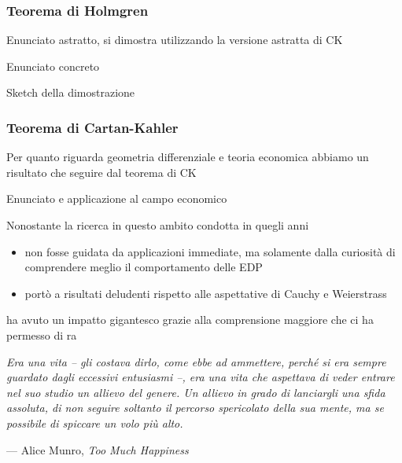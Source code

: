 \documentclass{beamer}
\begin{document}
\begin{frame}
\frametitle{Teorema di Holmgren}
Enunciato astratto, si dimostra utilizzando la versione astratta di CK
\end{frame}


\begin{frame}
Enunciato concreto
\end{frame}

\begin{frame}
Sketch della dimostrazione
\end{frame}

\begin{frame}
\frametitle{Teorema di Cartan-Kahler}
Per quanto riguarda geometria differenziale e teoria economica abbiamo un risultato che seguire dal teorema di CK

Enunciato e applicazione al campo economico
\end{frame}

\begin{frame}
Nonostante la ricerca in questo ambito condotta in quegli anni
\begin{itemize}
\item non fosse guidata da applicazioni immediate, ma solamente dalla curiosità di comprendere meglio il comportamento delle EDP
\item portò a risultati deludenti rispetto alle aspettative di Cauchy e Weierstrass
\end{itemize}
ha avuto un impatto gigantesco grazie alla comprensione maggiore che ci ha permesso di ra
\end{frame}

\begin{frame}

\begin{center}
\textit{
Era una vita -- gli costava dirlo, come ebbe ad ammettere,
perché si era sempre guardato dagli eccessivi entusiasmi --, era una vita
che aspettava di veder entrare nel suo studio un allievo del genere. 
Un allievo in grado di lanciargli una sfida assoluta, 
di non seguire soltanto il percorso spericolato della sua mente, 
ma se possibile di spiccare un volo più alto.
}
\end{center}
\null\hfill --- Alice Munro, \textit{Too Much Happiness}
\end{frame}
\end{document}
